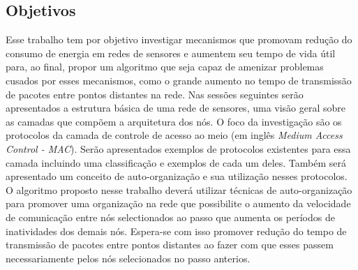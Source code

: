 \subsection{Objetivos}

Esse trabalho tem por objetivo investigar mecanismos que promovam redução do consumo de energia em redes de sensores e aumentem seu tempo de vida útil para, ao final, propor um algoritmo que seja capaz de amenizar problemas cusados por esses mecanismos, como o grande aumento no tempo de transmissão de pacotes entre pontos distantes na rede. Nas sessões seguintes serão apresentados a estrutura básica de uma rede de sensores, uma visão geral sobre as camadas que compõem a arquitetura dos nós. O foco da investigação são os protocolos da camada de controle de acesso ao meio (em inglês \emph{Medium Access Control - MAC}). Serão apresentados exemplos de protocolos existentes para essa camada incluindo uma classificação e exemplos de cada um deles. Também será apresentado um conceito de auto-organização e sua utilização nesses protocolos. O algoritmo proposto nesse trabalho deverá utilizar técnicas de auto-organização para promover uma organização na rede que possibilite o aumento da velocidade de comunicação entre nós selectionados ao passo que aumenta os períodos de inatividades dos demais nós. Espera-se com isso promover redução do tempo de transmissão de pacotes entre pontos distantes ao fazer com que esses passem necessariamente pelos nós selecionados no passo anterios. 